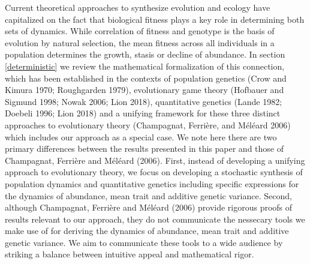 \documentclass[]{article}
\begin{document}
Current theoretical approaches to synthesize evolution and ecology have
capitalized on the fact that biological fitness plays a key role in
determining both sets of dynamics. While correlation of fitness and
genotype is the basis of evolution by natural selection, the mean
fitness across all individuals in a population determines the growth,
stasis or decline of abundance. In section \ref{deterministic} we review
the mathematical formalization of this connection, which has been
established in the contexts of population genetics (Crow and Kimura
1970; Roughgarden 1979), evolutionary game theory (Hofbauer and Sigmund
1998; Nowak 2006; Lion 2018), quantitative genetics (Lande 1982; Doebeli
1996; Lion 2018) and a unifying framework for these three distinct
approaches to evolutionary theory (Champagnat, Ferrière, and Méléard
2006) which includes our approach as a special case. We note here there
are two primary differences between the results presented in this paper
and those of Champagnat, Ferrière and Méléard (2006). First, instead of
developing a unifying approach to evolutionary theory, we focus on
developing a stochastic synthesis of population dynamics and
quantitative genetics including specific expressions for the dynamics of
abundance, mean trait and additive genetic variance. Second, although
Champagnat, Ferrière and Méléard (2006) provide rigorous proofs of
results relevant to our approach, they do not communicate the nessecary
tools we make use of for deriving the dynamics of abundance, mean trait
and additive genetic variance. We aim to communicate these tools to a
wide audience by striking a balance between intuitive appeal and
mathematical rigor.
\end{document}
